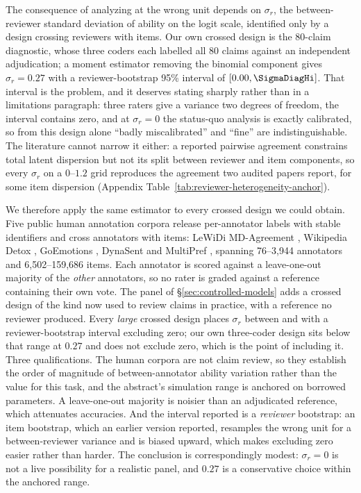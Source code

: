 \documentclass[11pt]{article}
\begin{document}
The consequence of analyzing at the wrong unit depends on $\sigma_r$, the
between-reviewer standard deviation of ability on the logit scale, identified
only by a design crossing reviewers with items. Our own crossed design is the
80-claim diagnostic, whose three coders each labelled all 80 claims against an
independent adjudication; a moment estimator removing the binomial component
gives $\hat\sigma_r=0.27$ with a reviewer-bootstrap 95\% interval of
$[0.00,\SigmaDiagHi]$. That interval is the problem, and it deserves stating
sharply rather than in a limitations paragraph: three raters give a variance two
degrees of freedom, the interval contains zero, and at $\sigma_r=0$ the
status-quo analysis is exactly calibrated, so from this design alone ``badly
miscalibrated'' and ``fine'' are indistinguishable. The literature cannot narrow
it either: a reported pairwise agreement constrains total latent dispersion but
not its split between reviewer and item components, so every $\sigma_r$ on a
$0$--$1.2$ grid reproduces the agreement two audited papers report, for some
item dispersion (Appendix
Table~\ref{tab:reviewer-heterogeneity-anchor}).



We therefore apply the same estimator to every crossed design we could obtain.
Five public human annotation corpora release per-annotator labels with stable
identifiers and cross annotators with items: LeWiDi MD-Agreement
\citep{leonardelli2023semeval}, Wikipedia Detox \citep{wulczyn2017detox},
GoEmotions \citep{demszky2020goemotions}, DynaSent \citep{potts2021dynasent}
and MultiPref \citep{miranda2024multipref}, spanning 76--3{,}944 annotators and
6{,}502--159{,}686 items. Each annotator is scored against a leave-one-out
majority of the \emph{other} annotators, so no rater is graded against a
reference containing their own vote. The panel of
\S\ref{sec:controlled-models} adds a crossed design of the kind now used to
review claims in practice, with a reference no reviewer produced. Every
\emph{large} crossed design places $\sigma_r$ between \SigmaMin{} and
\SigmaMax{} with a reviewer-bootstrap interval excluding zero; our own
three-coder design sits below that range at $0.27$ and does not exclude zero,
which is the point of including it. Three
qualifications. The human corpora are not claim review, so they establish the
order of magnitude of between-annotator ability variation rather than the value
for this task, and the abstract's simulation range is anchored on borrowed
parameters. A leave-one-out majority is noisier than an adjudicated reference,
which attenuates accuracies. And the interval reported is a \emph{reviewer}
bootstrap: an item bootstrap, which an earlier version reported, resamples the
wrong unit for a between-reviewer variance and is biased upward, which makes
excluding zero easier rather than harder. The conclusion is correspondingly
modest: $\sigma_r=0$ is not a live possibility for a realistic panel, and $0.27$
is a conservative choice within the anchored range.
\end{document}
